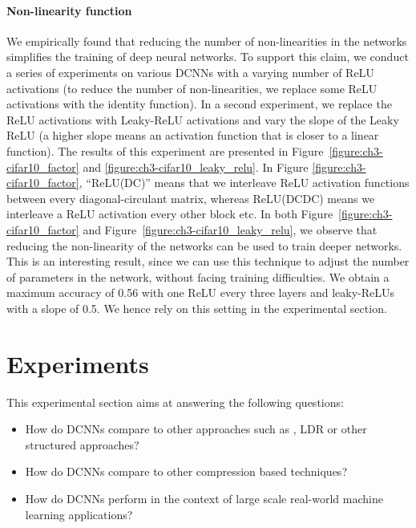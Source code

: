 \paragraph{Non-linearity function}

We empirically found that reducing the number of non-linearities in the networks simplifies the training of deep neural networks.
To support this claim, we conduct a series of experiments on various DCNNs with a varying number of ReLU activations (to reduce the number of non-linearities, we replace some ReLU activations with the identity function).
In a second experiment, we replace the ReLU activations with Leaky-ReLU activations and vary the slope of the Leaky ReLU (a higher slope means an activation function that is closer to a linear function).
The results of this experiment are presented in Figure~\ref{figure:ch3-cifar10_factor} and \ref{figure:ch3-cifar10_leaky_relu}.
In Figure \ref{figure:ch3-cifar10_factor}, ``ReLU(DC)'' means that we interleave ReLU activation functions between every diagonal-circulant matrix, whereas ReLU(DCDC) means we interleave a ReLU activation every other block etc.
In both Figure~\ref{figure:ch3-cifar10_factor} and  Figure~\ref{figure:ch3-cifar10_leaky_relu}, we observe that reducing the non-linearity of the networks can be used to train deeper networks.
This is an interesting result, since  we can use this technique to adjust the number of parameters in the network, without facing training difficulties. We obtain a maximum accuracy of 0.56 with one ReLU every three layers and leaky-ReLUs with a slope of 0.5.
We hence rely on this setting in the experimental section. 

\section{Experiments}
\label{section:ch3-experiments}

This experimental section aims at answering the following questions:
\begin{itemize}
    \item[] How do DCNNs compare to other approaches such as \ACDC, LDR or other structured approaches?
    \item[] How do DCNNs compare to other compression based techniques?
    \item[] How do DCNNs perform in the context of large scale real-world machine learning applications?  
\end{itemize}


